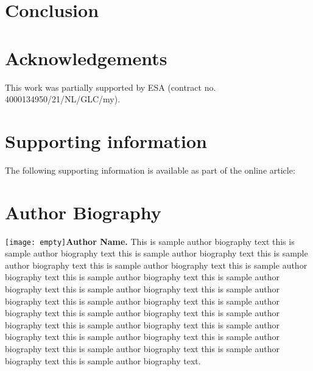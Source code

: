 \documentclass[AMA,STIX1COL]{WileyNJD-v2}
\begin{document}
\section*{Conclusion}

\section*{Acknowledgements}
This work was partially supported by ESA (contract no. 4000134950/21/NL/GLC/my).

\section*{Supporting information}

The following supporting information is available as part of the online article:

%
%
%
%
%
% 

%
%
%

\clearpage

\section*{Author Biography}

\begin{biography}{\texttt{[image: empty]}}{\textbf{Author Name.} This is sample author biography text this is sample author biography text this is sample author biography text this is sample author biography text this is sample author biography text this is sample author biography text this is sample author biography text this is sample author biography text this is sample author biography text this is sample author biography text this is sample author biography text this is sample author biography text this is sample author biography text this is sample author biography text this is sample author biography text this is sample author biography text this is sample author biography text this is sample author biography text this is sample author biography text this is sample author biography text this is sample author biography text.}
\end{biography}
\end{document}
